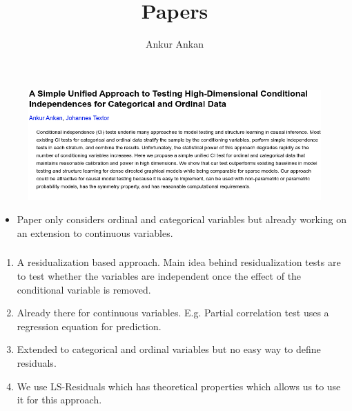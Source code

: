 \documentclass{beamer}
\begin{document}
\title[]{Papers}
\author [] {Ankur Ankan}
\date{}
\maketitle

\begin{frame}
	\frametitle{}
	\begin{figure}
		\centering
		\includegraphics[scale=0.4]{imgs/ankan_textor}
		\caption*{}
	\end{figure}
	\vspace{-2em}
	\begin{itemize}
		\item Paper only considers ordinal and categorical variables
			but already working on an extension to continuous
			variables.
	\end{itemize}
\end{frame}

\begin{frame}
	\frametitle{}
	\begin{enumerate}
		\item A residualization based approach. Main idea behind
			residualization tests are to test whether the variables
			are independent once the effect of the conditional
			variable is removed.
		\item Already there for continuous variables. E.g. Partial correlation test uses a regression equation for prediction.
		\item Extended to categorical and ordinal variables but no easy way to define residuals. 
		\item We use LS-Residuals which has theoretical properties which allows us to use it for this approach.
	\end{enumerate}
\end{frame}
\end{document}
